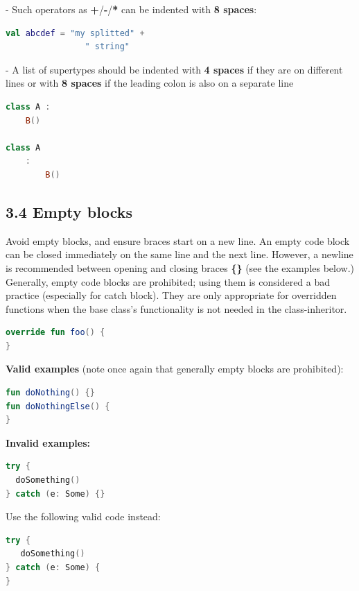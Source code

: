 - Such operators as \textbf{+}/\textbf{-}/\textbf{*} can be indented with \textbf{8 spaces}:
    
\begin{lstlisting}[language=Kotlin]
val abcdef = "my splitted" +
                " string"
\end{lstlisting}
    
- A list of supertypes should be indented with \textbf{4 spaces} if they are on different lines or with \textbf{8 spaces} if the leading colon is also on a separate line
\begin{lstlisting}[language=Kotlin]
class A :
    B()
    
class A
    :
        B()
\end{lstlisting}
\subsection*{\textbf{3.4 Empty blocks}}
\label{sec:3.4}
Avoid empty blocks, and ensure braces start on a new line. An empty code block can be closed immediately on the same line and the next line. However, a newline is recommended between opening and closing braces \textbf{\{\}} (see the examples below.)
Generally, empty code blocks are prohibited; using them is considered a bad practice (especially for catch block).
They are only appropriate for overridden functions when the base class's functionality is not needed in the class-inheritor.
\begin{lstlisting}[language=Kotlin]
override fun foo() {    
}
\end{lstlisting}
\textbf{Valid examples} (note once again that generally empty blocks are prohibited):
\begin{lstlisting}[language=Kotlin]
fun doNothing() {} 
fun doNothingElse() {
}
\end{lstlisting}
\textbf{Invalid examples:}
\begin{lstlisting}[language=Kotlin]
try {
  doSomething()
} catch (e: Some) {}
\end{lstlisting}
Use the following valid code instead:
\begin{lstlisting}[language=Kotlin]
try {
   doSomething()
} catch (e: Some) {
}
\end{lstlisting}
